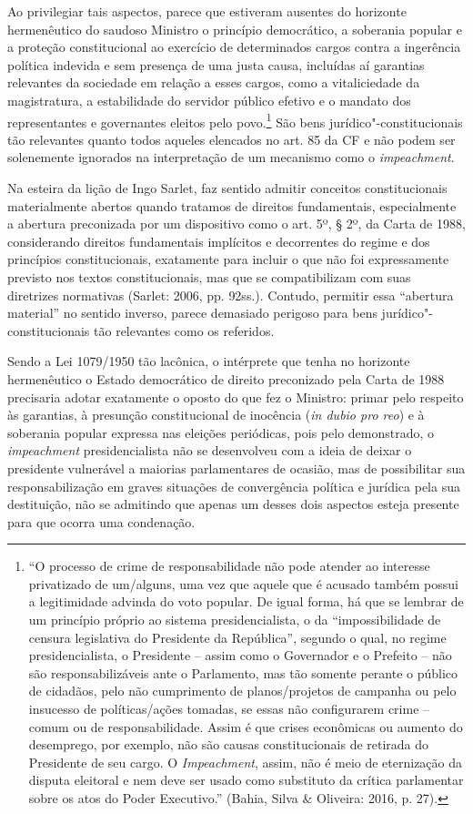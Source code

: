 Ao privilegiar tais aspectos, parece que estiveram ausentes do horizonte
hermenêutico do saudoso Ministro o princípio democrático, a soberania
popular e a proteção constitucional ao exercício de determinados cargos
contra a ingerência política indevida e sem presença de uma justa causa,
incluídas aí garantias relevantes da sociedade em relação a esses
cargos, como a vitaliciedade da magistratura, a estabilidade do servidor
público efetivo e o mandato dos representantes e governantes eleitos
pelo povo.\footnote{``O processo de crime de responsabilidade não pode
  atender ao interesse privatizado de um/alguns, uma vez que aquele que
  é acusado também possui a legitimidade advinda do voto popular. De
  igual forma, há que se lembrar de um princípio próprio ao sistema
  presidencialista, o da ``impossibilidade de censura legislativa do
  Presidente da República'', segundo o qual, no regime presidencialista,
  o Presidente -- assim como o Governador e o Prefeito -- não são
  responsabilizáveis ante o Parlamento, mas tão somente perante o
  público de cidadãos, pelo não cumprimento de planos/projetos de
  campanha ou pelo insucesso de políticas/ações tomadas, se essas não
  configurarem crime -- comum ou de responsabilidade. Assim é que crises
  econômicas ou aumento do desemprego, por exemplo, não são causas
  constitucionais de retirada do Presidente de seu cargo. O
  \emph{Impeachment}, assim, não é meio de eternização da disputa
  eleitoral e nem deve ser usado como substituto da crítica parlamentar
  sobre os atos do Poder Executivo.'' (Bahia, Silva \& Oliveira: 2016,
  p. 27).} São bens jurídico"-constitucionais tão relevantes quanto todos
aqueles elencados no art. 85 da CF e não podem ser solenemente ignorados
na interpretação de um mecanismo como o \emph{impeachment}.

Na esteira da lição de Ingo Sarlet, faz sentido admitir conceitos
constitucionais materialmente abertos quando tratamos de direitos
fundamentais, especialmente a abertura preconizada por um dispositivo
como o art. 5º, § 2º, da Carta de 1988, considerando direitos
fundamentais implícitos e decorrentes do regime e dos princípios
constitucionais, exatamente para incluir o que não foi expressamente
previsto nos textos constitucionais, mas que se compatibilizam com suas
diretrizes normativas (Sarlet: 2006, pp. 92ss.). Contudo, permitir essa
``abertura material'' no sentido inverso, parece demasiado perigoso para
bens jurídico"-constitucionais tão relevantes como os referidos.

Sendo a Lei 1079/1950 tão lacônica, o intérprete que tenha no horizonte
hermenêutico o Estado democrático de direito preconizado pela Carta de
1988 precisaria adotar exatamente o oposto do que fez o Ministro: primar
pelo respeito às garantias, à presunção constitucional de inocência
(\emph{in dubio pro reo}) e à soberania popular expressa nas eleições
periódicas, pois pelo demonstrado, o \emph{impeachment} presidencialista
não se desenvolveu com a ideia de deixar o presidente vulnerável a
maiorias parlamentares de ocasião, mas de possibilitar sua
responsabilização em graves situações de convergência política e
jurídica pela sua destituição, não se admitindo que apenas um desses
dois aspectos esteja presente para que ocorra uma condenação.

